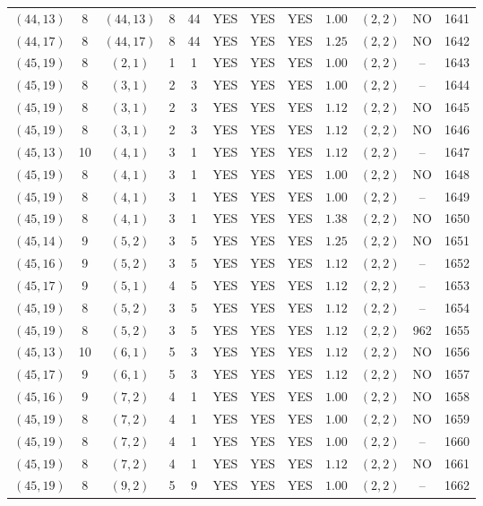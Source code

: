 \begin{longtable}{|c|c|c|c|c|c|c|c|c|c|c|c|}
$(44,13)$ & 8 & $(44,13)$ & 8 & 44 & YES & YES & YES & $1.00$ & $(2,2)$ & NO & 1641\\
$(44,17)$ & 8 & $(44,17)$ & 8 & 44 & YES & YES & YES & $1.25$ & $(2,2)$ & NO & 1642\\
$(45,19)$ & 8 & $(2,1)$ & 1 & 1 & YES & YES & YES & $1.00$ & $(2,2)$ & -- & 1643\\
$(45,19)$ & 8 & $(3,1)$ & 2 & 3 & YES & YES & YES & $1.00$ & $(2,2)$ & -- & 1644\\
$(45,19)$ & 8 & $(3,1)$ & 2 & 3 & YES & YES & YES & $1.12$ & $(2,2)$ & NO & 1645\\
$(45,19)$ & 8 & $(3,1)$ & 2 & 3 & YES & YES & YES & $1.12$ & $(2,2)$ & NO & 1646\\
$(45,13)$ & 10 & $(4,1)$ & 3 & 1 & YES & YES & YES & $1.12$ & $(2,2)$ & -- & 1647\\
$(45,19)$ & 8 & $(4,1)$ & 3 & 1 & YES & YES & YES & $1.00$ & $(2,2)$ & NO & 1648\\
$(45,19)$ & 8 & $(4,1)$ & 3 & 1 & YES & YES & YES & $1.00$ & $(2,2)$ & -- & 1649\\
$(45,19)$ & 8 & $(4,1)$ & 3 & 1 & YES & YES & YES & $1.38$ & $(2,2)$ & NO & 1650\\
$(45,14)$ & 9 & $(5,2)$ & 3 & 5 & YES & YES & YES & $1.25$ & $(2,2)$ & NO & 1651\\
$(45,16)$ & 9 & $(5,2)$ & 3 & 5 & YES & YES & YES & $1.12$ & $(2,2)$ & -- & 1652\\
$(45,17)$ & 9 & $(5,1)$ & 4 & 5 & YES & YES & YES & $1.12$ & $(2,2)$ & -- & 1653\\
$(45,19)$ & 8 & $(5,2)$ & 3 & 5 & YES & YES & YES & $1.12$ & $(2,2)$ & -- & 1654\\
$(45,19)$ & 8 & $(5,2)$ & 3 & 5 & YES & YES & YES & $1.12$ & $(2,2)$ & 962 & 1655\\
$(45,13)$ & 10 & $(6,1)$ & 5 & 3 & YES & YES & YES & $1.12$ & $(2,2)$ & NO & 1656\\
$(45,17)$ & 9 & $(6,1)$ & 5 & 3 & YES & YES & YES & $1.12$ & $(2,2)$ & NO & 1657\\
$(45,16)$ & 9 & $(7,2)$ & 4 & 1 & YES & YES & YES & $1.00$ & $(2,2)$ & NO & 1658\\
$(45,19)$ & 8 & $(7,2)$ & 4 & 1 & YES & YES & YES & $1.00$ & $(2,2)$ & NO & 1659\\
$(45,19)$ & 8 & $(7,2)$ & 4 & 1 & YES & YES & YES & $1.00$ & $(2,2)$ & -- & 1660\\
$(45,19)$ & 8 & $(7,2)$ & 4 & 1 & YES & YES & YES & $1.12$ & $(2,2)$ & NO & 1661\\
$(45,19)$ & 8 & $(9,2)$ & 5 & 9 & YES & YES & YES & $1.00$ & $(2,2)$ & -- & 1662\\

\end{longtable}
